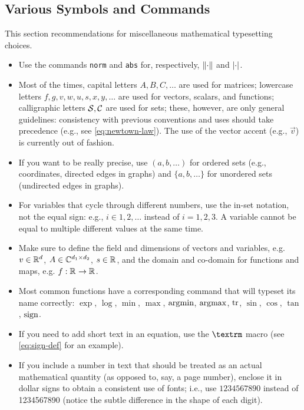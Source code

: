 \documentclass[letterpaper, 10 pt, conference]{ieeeconf}
\begin{document}
\subsection{Various Symbols and Commands}
This section recommendations for miscellaneous mathematical typesetting choices.
\begin{itemize}
\item Use the commands \texttt{norm} and \texttt{abs} for, respectively, $\lVert\cdot\rVert$ and $\lvert\cdot\rvert$.
\item Most of the times, capital letters $A,B,C,\ldots$ are used for matrices; lowercase letters $f,g,v,w,u,s,x,y,\ldots$ are used for vectors, scalars, and functions; calligraphic letters $\mathcal{S},\mathcal{C}$ are used for sets; these, however, are only general guidelines: consistency with previous conventions and uses should take precedence (e.g., see \ref{eq:newtown-law}). The use of the vector accent (e.g., $\vec{v}$) is currently out of fashion.
\item If you want to be really precise, use $(a,b,\ldots)$ for ordered sets (e.g., coordinates, directed edges in graphs) and $\{a,b,\ldots\}$ for unordered sets (undirected edges in graphs).
\item For variables that cycle through different numbers, use the in-set notation, not the equal sign: e.g., $i\in{1,2,\ldots}$ instead of $i=1,2,3$. A variable cannot be equal to multiple different values at the same time.
\item Make sure to define the field and dimensions of vectors and variables, e.g. $v\in\mathbb{R}^{d}{}$, $A\in\mathbb{C}^{d_1\times d_2}{}$, $s\in\mathbb{R}^{}{}$, and the domain and co-domain for functions and maps, e.g. $f:\mathbb{R}^{}{}\to\mathbb{R}^{}{}$.
\item Most common functions have a corresponding command that will typeset its name correctly: $\exp$, $\log$, $\min$, $\max$, $\operatorname*{\arg\!\min}$, $\operatorname*{\arg\!\max}$, $\operatorname{tr}$, $\sin$, $\cos$, $\tan$, $\operatorname{sign}$.
\item If you need to add short text in an equation, use the $\verb|\textrm|$ macro (see \eqref{eq:sign-def} for an example).
\item If you include a number in text that should be treated as an actual mathematical quantity (as opposed to, say, a page number), enclose it in dollar signs to obtain a consistent use of fonts; i.e., use $1234567890$ instead of 1234567890 (notice the subtle difference in the shape of each digit).
\end{itemize}
\end{document}
